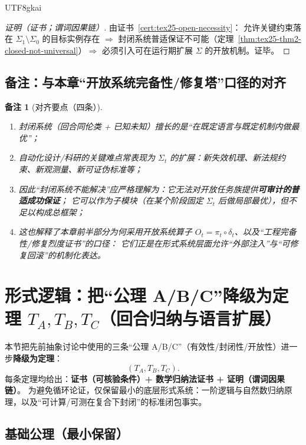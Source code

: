 \documentclass[12pt]{article}
\newtheorem{remark}{备注}[section]
\begin{document}
\begin{CJK*}{UTF8}{gkai}
\begin{proof}[证明（证书；谓词因果链）]
由证书~\ref{cert:tex25-open-necessity}：
允许关键约束落在 $\Sigma_1\setminus\Sigma_0$ 的目标实例存在 $\Rightarrow$
封闭系统普适保证不可能（定理~\ref{thm:tex25-thm2-closed-not-universal}）$\Rightarrow$
必须引入可在运行期扩展 $\Sigma$ 的开放机制。证毕。
\end{proof}

\subsection{备注：与本章“开放系统完备性/修复塔”口径的对齐}
\label{subsec:tex25-closed-open-remark}

\begin{remark}[对齐要点（四条）]
\begin{enumerate}
  \item 封闭系统（回合同伦类 + 已知未知）擅长的是“在既定语言与既定机制内做最优”；
  \item 自动化设计/科研的关键难点常表现为 $\Sigma_t$ 的扩展：新失效机理、新法规约束、新观测量、新可证伪标准等；
  \item 因此“封闭系统不能解决”应严格理解为：它无法对开放任务族提供\textbf{可审计的普适成功保证}；
  它可以作为子模块（在某个阶段固定 $\Sigma_t$ 后做局部最优），但不足以构成总框架；
  \item 这也解释了本章前半部分为何采用开放系统算子 $O_t=\pi_t\circ\delta_t$、以及“工程完备性/修复烈度证书”的口径：
  它们正是在形式系统层面允许“外部注入”与“可修复回滚”的机制化表达。
\end{enumerate}
\end{remark}

\section{形式逻辑：把“公理 A/B/C”降级为定理 $T_A,T_B,T_C$（回合归纳与语言扩展）}
\label{sec:tex24-ta-tb-tc}

本节把先前抽象讨论中使用的三条“公理 A/B/C”（有效性/封闭性/开放性）进一步\textbf{降级为定理}：
\[
  (T_A,T_B,T_C).
\]
每条定理均给出：\textbf{证书（可核验条件）+ 数学归纳法证书 + 证明（谓词因果链）}。
为避免循环论证，仅保留最小的底层形式系统：一阶逻辑与自然数归纳原理，以及“可计算/可测在复合下封闭”的标准闭包事实。

\subsection{基础公理（最小保留）}
\label{sec:tex24-ta-tb-tc-base}


\end{CJK*}
\end{document}
